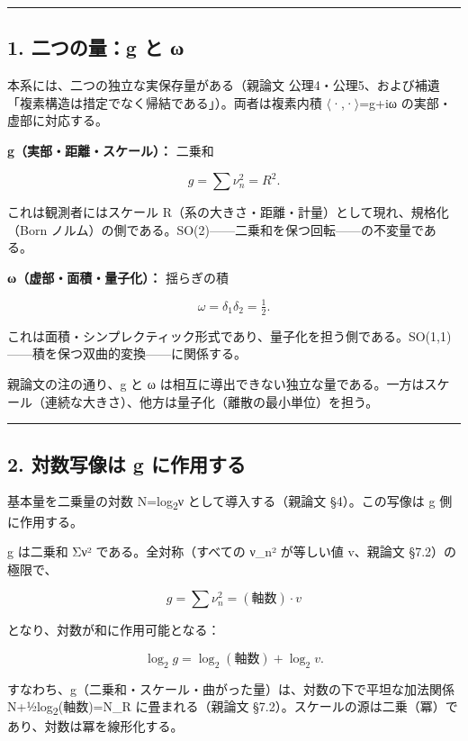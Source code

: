 \documentclass[11pt]{ltjsarticle}
\begin{document}
\begin{center}\rule{0.5\linewidth}{0.5pt}\end{center}

\subsection{1. 二つの量：g と
ω}\label{ux4e8cux3064ux306eux91cfg-ux3068-ux3c9}

本系には、二つの独立な実保存量がある（親論文
公理4・公理5、および補遺「複素構造は措定でなく帰結である」）。両者は複素内積
$\langle$·,·$\rangle$=g+iω の実部・虚部に対応する。

\textbf{g（実部・距離・スケール）：} 二乗和

\[g = \sum \nu_n^2 = R^2.\]

これは観測者にはスケール
R（系の大きさ・距離・計量）として現れ、規格化（Born
ノルム）の側である。SO(2)------二乗和を保つ回転------の不変量である。

\textbf{ω（虚部・面積・量子化）：} 揺らぎの積

\[\omega = \delta_1\delta_2 = \tfrac{1}{2}.\]

これは面積・シンプレクティック形式であり、量子化を担う側である。SO(1,1)------積を保つ双曲的変換------に関係する。

親論文の注の通り、g と ω
は相互に導出できない独立な量である。一方はスケール（連続な大きさ）、他方は量子化（離散の最小単位）を担う。

\begin{center}\rule{0.5\linewidth}{0.5pt}\end{center}

\subsection{2. 対数写像は g
に作用する}\label{ux5bfeux6570ux5199ux50cfux306f-g-ux306bux4f5cux7528ux3059ux308b}

基本量を二乗量の対数 N=log\textsubscript{2}ν として導入する（親論文 §4）。この写像は g
側に作用する。

g は二乗和 Σν² である。全対称（すべての ν\_n² が等しい値 v、親論文
§7.2）の極限で、

\[g = \sum\nu_n^2 = (\text{軸数})\cdot v\]

となり、対数が和に作用可能となる：

\[\log_2 g = \log_2(\text{軸数}) + \log_2 v.\]

すなわち、g（二乗和・スケール・曲がった量）は、対数の下で平坦な加法関係
N+½log\textsubscript{2}(軸数)=N\_R に畳まれる（親論文
§7.2）。スケールの源は二乗（冪）であり、対数は冪を線形化する。
\end{document}
